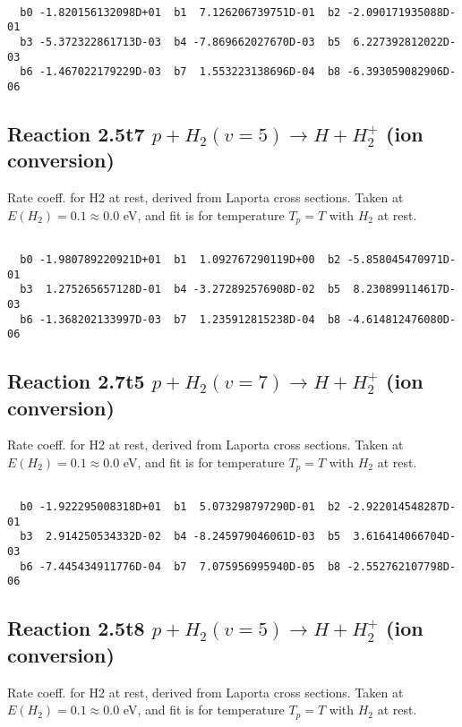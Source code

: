 \begin{small}\begin{verbatim}

  b0 -1.820156132098D+01  b1  7.126206739751D-01  b2 -2.090171935088D-01
  b3 -5.372322861713D-03  b4 -7.869662027670D-03  b5  6.227392812022D-03
  b6 -1.467022179229D-03  b7  1.553223138696D-04  b8 -6.393059082906D-06

\end{verbatim}\end{small}

\newpage
\subsection{
Reaction 2.5t7
$ p + H_2(v=5) \rightarrow H + H_2^+$ (ion conversion)
}
Rate coeff. for H2 at rest, derived from Laporta cross sections.
Taken at $E(H_2) = 0.1 \approx 0.0$ eV,  and fit is for temperature $T_p=T$ with $H_2$ at rest.

\begin{small}\begin{verbatim}

  b0 -1.980789220921D+01  b1  1.092767290119D+00  b2 -5.858045470971D-01
  b3  1.275265657128D-01  b4 -3.272892576908D-02  b5  8.230899114617D-03
  b6 -1.368202133997D-03  b7  1.235912815238D-04  b8 -4.614812476080D-06

\end{verbatim}\end{small}

\newpage
\subsection{
Reaction 2.7t5
$ p + H_2(v=7) \rightarrow H + H_2^+$ (ion conversion)
}
Rate coeff. for H2 at rest, derived from Laporta cross sections.
Taken at $E(H_2) = 0.1 \approx 0.0$ eV,  and fit is for temperature $T_p=T$ with $H_2$ at rest.

\begin{small}\begin{verbatim}

  b0 -1.922295008318D+01  b1  5.073298797290D-01  b2 -2.922014548287D-01
  b3  2.914250534332D-02  b4 -8.245979046061D-03  b5  3.616414066704D-03
  b6 -7.445434911776D-04  b7  7.075956995940D-05  b8 -2.552762107798D-06

\end{verbatim}\end{small}

\newpage
\subsection{
Reaction 2.5t8
$ p + H_2(v=5) \rightarrow H + H_2^+$ (ion conversion)
}
Rate coeff. for H2 at rest, derived from Laporta cross sections.
Taken at $E(H_2) = 0.1 \approx 0.0$ eV,  and fit is for temperature $T_p=T$ with $H_2$ at rest.


